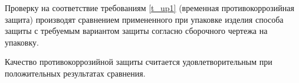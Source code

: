 Проверку на соответствие требованиям \ref{t_up1} (временная противокоррозийная защита) производят сравнением примененного при упаковке изделия способа защиты с требуемым вариантом защиты согласно сборочного чертежа на упаковку.

Качество противокоррозийной защиты считается удовлетворительным при положительных результатах сравнения.

